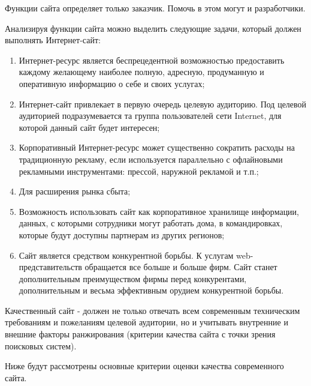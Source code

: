 Функции сайта определяет только заказчик. Помочь в этом могут и разработчики.

Анализируя функции сайта можно выделить следующие задачи, который должен выполнять Интернет-сайт:
\begin{enumerate}[label=\arabic*)]
  \item Интернет-ресурс является беспрецедентной возможностью предоставить каждому желающему наиболее полную, адресную, продуманную и оперативную информацию о себе и своих услугах;
  \item Интернет-сайт привлекает в первую очередь целевую аудиторию. Под целевой аудиторией подразумевается та группа пользователей сети Internet, для которой данный сайт будет интересен;
  \item Корпоративный Интернет-ресурс может существенно сократить расходы на традиционную рекламу, если используется параллельно с офлайновыми рекламными инструментами: прессой, наружной рекламой и т.п.;
  \item Для расширения рынка сбыта;
  \item Возможность использовать сайт как корпоративное хранилище информации, данных, с которыми сотрудники могут работать дома, в командировках, которые будут доступны партнерам из других регионов;
  \item Сайт является средством конкурентной борьбы.
  К услугам web-представительств обращается все больше и больше фирм.
  Сайт станет дополнительным преимуществом фирмы перед конкурентами, дополнительным и весьма эффективным орудием конкурентной борьбы.
\end{enumerate}

Качественный сайт - должен не только отвечать всем современным техническим требованиям и пожеланиям целевой аудитории, но и учитывать внутренние и внешние факторы ранжирования (критерии качества сайта с точки зрения поисковых систем).

Ниже будут рассмотрены основные критерии оценки качества современного сайта.

